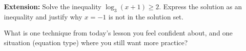 \documentclass[10pt]{article}
\begin{document}
\vspace{0.1in}

\begin{extensionbox}
\textbf{Extension:} Solve the inequality $\log_3(x+1) \geq 2$. Express the solution as an
inequality and justify why $x = -1$ is not in the solution set.

\end{extensionbox}

\vspace{0.1in}

\begin{reflectionbox}
What is one technique from today's lesson you feel confident about, and one situation
(equation type) where you still want more practice?

\end{reflectionbox}
\end{document}
